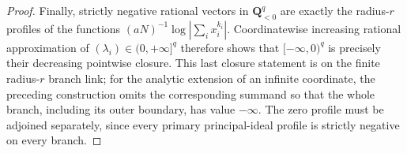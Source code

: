 \begin{proof}
Finally, strictly negative rational vectors in \(\mathbf Q_{<0}^q\) are
exactly the radius-\(r\) profiles of the functions
\((aN)^{-1}\log|\sum_i x_i^{k_i}|\).  Coordinatewise
increasing rational approximation of
\((\lambda_i)\in(0,+\infty]^q\) therefore shows that
\([-\infty,0)^q\) is precisely their decreasing pointwise closure.
This last closure statement is on the finite radius-\(r\) branch link; for
the analytic extension of an infinite coordinate, the preceding construction
omits the corresponding summand so that the whole branch, including its
outer boundary, has value \(-\infty\).
The zero profile must be adjoined separately, since every primary
principal-ideal profile is strictly negative on every branch.
\end{proof}
